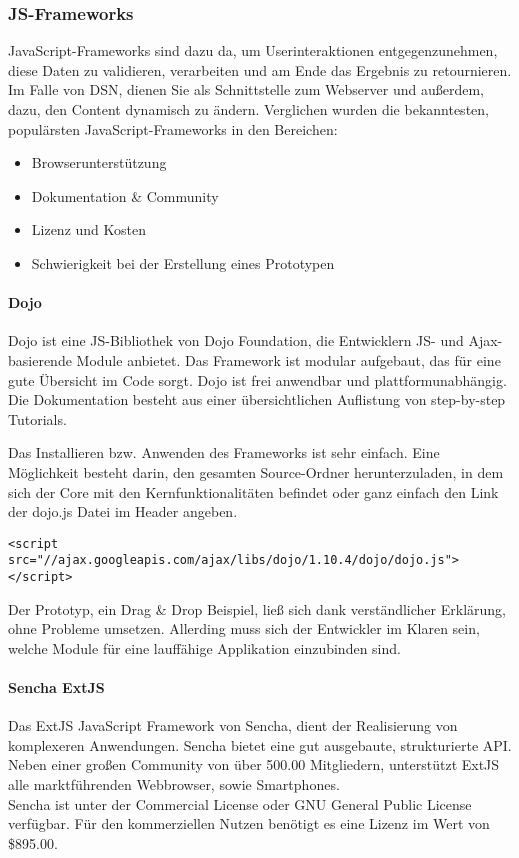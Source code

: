 \subsubsection{JS-Frameworks}
JavaScript-Frameworks sind dazu da, um Userinteraktionen entgegenzunehmen, diese Daten zu validieren, verarbeiten und am Ende das Ergebnis zu retournieren.\\
Im Falle von DSN, dienen Sie als Schnittstelle zum Webserver und außerdem, dazu, den Content dynamisch zu ändern. Verglichen wurden die bekanntesten, populärsten JavaScript-Frameworks in den Bereichen:
\begin{itemize}
\item Browserunterstützung
\item Dokumentation \& Community
\item Lizenz und Kosten
\item Schwierigkeit bei der Erstellung eines Prototypen
\end{itemize}
\paragraph{Dojo}
Dojo ist eine JS-Bibliothek von Dojo Foundation, die Entwicklern JS- und Ajax-basierende Module anbietet. Das Framework ist modular aufgebaut, das für eine gute Übersicht im Code sorgt. Dojo ist frei anwendbar und plattformunabhängig. Die Dokumentation besteht aus einer übersichtlichen Auflistung von step-by-step Tutorials. \cite{DOJO}

Das Installieren bzw. Anwenden des Frameworks ist sehr einfach. Eine Möglichkeit besteht darin, den gesamten Source-Ordner herunterzuladen, in dem sich der Core mit den Kernfunktionalitäten befindet oder ganz einfach den Link der dojo.js Datei im Header angeben.
\begin{lstlisting}[caption={Dojo einbinden\cite{DOJODOWN}}]
<script src="//ajax.googleapis.com/ajax/libs/dojo/1.10.4/dojo/dojo.js">
</script>
\end{lstlisting}

Der Prototyp, ein Drag \& Drop Beispiel, ließ sich dank verständlicher Erklärung, ohne Probleme umsetzen. Allerding muss sich der Entwickler im Klaren sein, welche Module für eine lauffähige Applikation einzubinden sind. \cite{DOJOINFO}

\paragraph{Sencha ExtJS}
Das ExtJS JavaScript Framework von Sencha, dient der Realisierung von komplexeren Anwendungen. Sencha bietet eine gut ausgebaute, strukturierte API. Neben einer großen Community von über 500.00 Mitgliedern, unterstützt ExtJS alle marktführenden Webbrowser, sowie Smartphones.\\
Sencha ist unter der Commercial License oder GNU General Public License verfügbar. Für den kommerziellen Nutzen benötigt es eine Lizenz im Wert von \$895.00.\cite{SENCHA}

